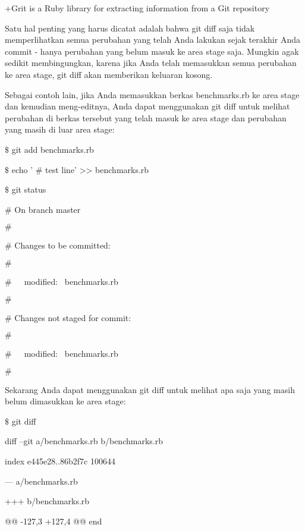 +Grit is a Ruby library for extracting information from a Git repository \par
\noindent 
Satu hal penting yang harus dicatat adalah bahwa git diff saja tidak memperlihatkan semua perubahan yang telah Anda lakukan sejak terakhir Anda commit - hanya perubahan yang belum masuk ke area stage saja. Mungkin agak sedikit membingungkan, karena jika Anda telah memasukkan semua perubahan ke area stage, git diff akan memberikan keluaran kosong. \par
\noindent 
Sebagai contoh lain, jika Anda memasukkan berkas benchmarks.rb ke area stage dan kemudian meng-editnya, Anda dapat menggunakan git diff untuk melihat perubahan di berkas tersebut yang telah masuk ke area stage dan perubahan yang masih di luar area stage: \par
\noindent 
 $  \$  $ git add benchmarks.rb \par
\noindent 
 $  \$  $ echo ' $  \#  $ test line' >> benchmarks.rb \par
\noindent 
 $  \$  $ git status \par
\noindent 
 $  \#  $ On branch master \par
\noindent 
 $  \#  $ \par
\noindent 
 $  \#  $ Changes to be committed: \par
\noindent 
 $  \#  $ \par
\noindent 
 $  \#  $~~~modified:~  benchmarks.rb \par
\noindent 
 $  \#  $ \par
\noindent 
 $  \#  $ Changes not staged for commit: \par
\noindent 
 $  \#  $ \par
\noindent 
 $  \#  $~~~modified:~  benchmarks.rb \par
\noindent 
 $  \#  $ \par
\noindent 
Sekarang Anda dapat menggunakan git diff untuk melihat apa saja yang masih belum dimasukkan ke area stage: \par
\vspace{12pt}
\noindent 
 $  \$  $ git diff  \par
\noindent 
diff --git a/benchmarks.rb b/benchmarks.rb \par
\noindent 
index e445e28..86b2f7c 100644 \par
\noindent 
--- a/benchmarks.rb \par
\noindent 
+++ b/benchmarks.rb \par
\noindent 
@@ -127,3 +127,4 @@ end \par
